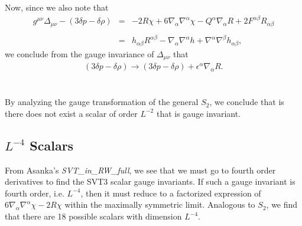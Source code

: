 \documentclass[10pt,letterpaper]{article}
\numberwithin{equation}{section}
\begin{document}
Now, since we also note that
\begin{eqnarray}
g^{\mu\nu}\Delta_{\mu\nu} - (3\delta p -\delta \rho) &=& - 2 R \chi + 6 \nabla_{\alpha }\nabla^{\alpha }\chi - Q^{\alpha } \nabla_{\alpha }R+2 F^{\alpha \beta } R_{\alpha \beta }
\\ \nonumber\\
&=& h_{\alpha \beta } R^{\alpha \beta } -  \nabla_{\alpha }\nabla^{\alpha }h + \nabla^{\alpha }\nabla^{\beta }h_{\alpha \beta },
\end{eqnarray}
we conclude from the gauge invariance of $\Delta_{\mu\nu}$ that 
\begin{eqnarray}
(3\delta p -\delta \rho) \to (3\delta p - \delta \rho) +   \epsilon^{\alpha } \nabla_{\alpha }R.
\end{eqnarray}
\\ \\
By analyzing the gauge transformation of the general $S_2$, we conclude that is there does not exist a scalar of order $L^{-2}$ that is gauge invariant. 
%
%
\subsection{$L^{-4}$ Scalars}
From Asanka's \emph{SVT\_in\_RW\_full}, we see that we must go to fourth order derivatives to find the SVT3 scalar gauge invariants. 
If such a gauge invariant is fourth order, i.e. $L^{-4}$, then it must reduce to a factorized expression of $6\nabla_\alpha\nabla^\alpha \chi -2R\chi$ within the maximally symmetric limit. Analogous to $S_2$, we find that there are 18 possible scalars with dimension $L^{-4}$. 
\end{document}
